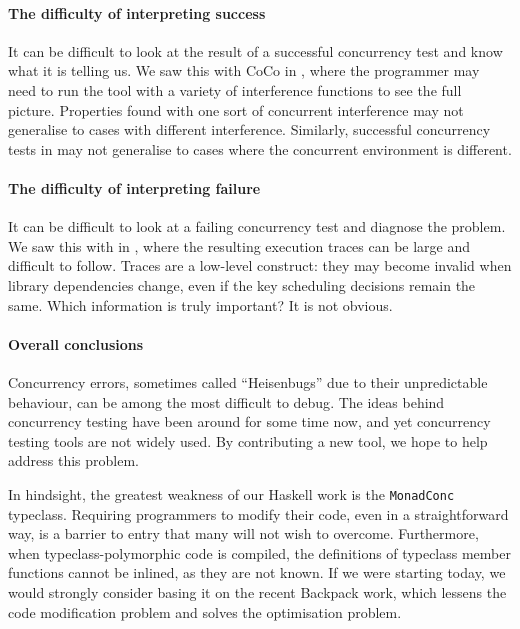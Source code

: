 \paragraph{The difficulty of interpreting success}
It can be difficult to look at the result of a successful concurrency
test and know what it is telling us.  We saw this with CoCo in
, where the programmer may need to run the tool
with a variety of interference functions to see the full picture.
Properties found with one sort of concurrent interference may not
generalise to cases with different interference.  Similarly,
successful concurrency tests in \dejafu{} may not generalise to cases
where the concurrent environment is different.

\paragraph{The difficulty of interpreting failure}
It can be difficult to look at a failing concurrency test and diagnose
the problem.  We saw this with \dejafu{} in
, where the resulting execution
traces can be large and difficult to follow.  Traces are a low-level
construct: they may become invalid when library dependencies change,
even if the key scheduling decisions remain the same.  Which
information is truly important?  It is not obvious.

\paragraph{Overall conclusions}
Concurrency errors, sometimes called ``Heisenbugs'' due to their
unpredictable behaviour, can be among the most difficult to
debug\cite{musuvathi2008osdi}.  The ideas behind concurrency testing
have been around for some time now\cite{godefroid1996}, and yet
concurrency testing tools are not widely used.  By contributing a new
tool, we hope to help address this problem.

In hindsight, the greatest weakness of our Haskell work is the
\verb|MonadConc| typeclass.  Requiring programmers to modify their
code, even in a straightforward way, is a barrier to entry that many
will not wish to overcome.  Furthermore, when typeclass-polymorphic
code is compiled, the definitions of typeclass member functions cannot
be inlined, as they are not known\cite{peytonjones2002}.  If we were
starting \dejafu{} today, we would strongly consider basing it on the
recent Backpack work\cite{yang2017}, which lessens the code
modification problem and solves the optimisation problem.
